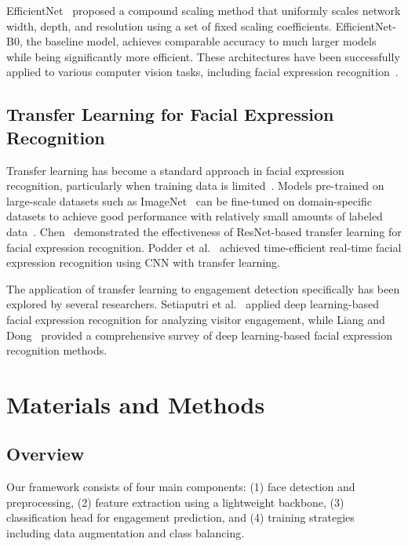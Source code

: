 \documentclass[apajournal,article,submit,pdftex,moreauthors]{Definitions/mdpi}
\begin{document}
EfficientNet~\citep{tan2019efficientnet} proposed a compound scaling method that uniformly scales network width, depth, and resolution using a set of fixed scaling coefficients. EfficientNet-B0, the baseline model, achieves comparable accuracy to much larger models while being significantly more efficient. These architectures have been successfully applied to various computer vision tasks, including facial expression recognition~\cite{podder2022time,chen2023resnet}.

\subsection{Transfer Learning for Facial Expression Recognition}

Transfer learning has become a standard approach in facial expression recognition, particularly when training data is limited~\citep{bengio2013representation}. Models pre-trained on large-scale datasets such as ImageNet~\cite{deng2009imagenet,russakovsky2015imagenet} can be fine-tuned on domain-specific datasets to achieve good performance with relatively small amounts of labeled data~\citep{li2021facial}. Chen~\citep{chen2023resnet} demonstrated the effectiveness of ResNet-based transfer learning for facial expression recognition. Podder et al.~\citep{podder2022time} achieved time-efficient real-time facial expression recognition using CNN with transfer learning.

The application of transfer learning to engagement detection specifically has been explored by several researchers. Setiaputri et al.~\citep{setiaputri2025deep} applied deep learning-based facial expression recognition for analyzing visitor engagement, while Liang and Dong~\citep{liang2023survey} provided a comprehensive survey of deep learning-based facial expression recognition methods.

\section{Materials and Methods}
\label{sec:method}

\subsection{Overview}

Our framework consists of four main components: (1) face detection and preprocessing, (2) feature extraction using a lightweight backbone, (3) classification head for engagement prediction, and (4) training strategies including data augmentation and class balancing.
\end{document}
